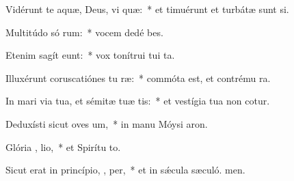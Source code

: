 \item Vidérunt te aquæ, Deus, vi  quæ:~* et timuérunt et turbátæ sunt si.
\item Multitúdo só rum:~* vocem dedé bes.
\item Etenim sagít  eunt:~* vox tonítrui tui  ta.
\item Illuxérunt coruscatiónes tu  ræ:~* commóta est, et contrému ra.
\item In mari via tua, et sémitæ tuæ   tis:~* et vestígia tua non cotur.
\item Deduxísti sicut oves  um,~* in manu Móysi  aron.
\item Glória ,  lio,~* et Spirítu to.
\item Sicut erat in princípio,  ,  per,~* et in sǽcula sæculó. men.
